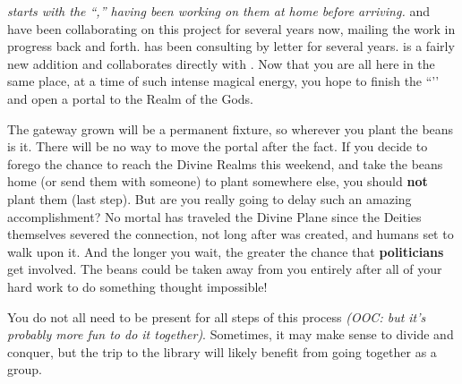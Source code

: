 \documentclass[green]{GL2020}
\begin{document}
\name{\gMagicBeans{}}

\emph{\cCurse{} starts with the ``\iBeansNB{},'' having been working on them at home before arriving.} \cFlowPriest{\full} and \cCurse{\full} have been collaborating on this project for several years now, mailing the work in progress back and forth. \cAssistantScientist{} has been consulting by letter for several years. \cAmbition{} is a fairly new addition and collaborates directly with \cFlowPriest{}. Now that you are all here in the same place, at a time of such intense magical energy, you hope to finish the ``\iBeansNB{}’’ and open a portal to the Realm of the Gods.

The gateway grown will be a permanent fixture, so wherever you plant the beans is it. There will be no way to move the portal after the fact. If you decide to forego the chance to reach the Divine Realms this weekend, and take the beans home (or send them with someone) to plant somewhere else, you should \textbf{not} plant them (last step). But are you really going to delay such an amazing accomplishment? No mortal has traveled the Divine Plane since the Deities themselves severed the connection, not long after \pEarth{} was created, and humans set to walk upon it. And the longer you wait, the greater the chance that \textbf{politicians} get involved. The beans could be taken away from you entirely after all of your hard work to do something thought impossible! 

You do not all need to be present for all steps of this process \emph{(OOC: but it’s probably more fun to do it together)}. Sometimes, it may make sense to divide and conquer, but the trip to the library will likely benefit from going together as a group.
\end{document}
